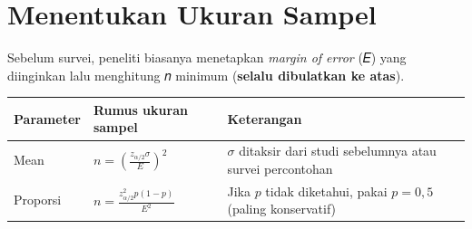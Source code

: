 \documentclass[
  indonesian,
  letterpaper,
]{book}
\newcounter{none} %
\begin{document}

\chapter{Menentukan Ukuran Sampel}\label{menentukan-ukuran-sampel}

Sebelum survei, peneliti biasanya menetapkan \emph{margin of error} (𝐸)
yang diinginkan lalu menghitung 𝑛 minimum (\textbf{selalu dibulatkan ke
atas}).

{\def\LTcaptype{none} %
\begin{longtable}[]{@{}
  >{\raggedright\arraybackslash}p{}
  >{\centering\arraybackslash}p{}
  >{\raggedright\arraybackslash}p{}@{}}
\toprule\noalign{}
\begin{minipage}[b]{\linewidth}\raggedright
Parameter
\end{minipage} & \begin{minipage}[b]{\linewidth}\centering
Rumus ukuran sampel
\end{minipage} & \begin{minipage}[b]{\linewidth}\raggedright
Keterangan
\end{minipage} \\
\midrule\noalign{}
\endhead
\bottomrule\noalign{}
\endlastfoot
Mean & \(n = \left(\frac{z_{\alpha/2}\sigma}{E}\right)^2\) & \(\sigma\)
ditaksir dari studi sebelumnya atau survei percontohan \\
Proporsi & \(n = \frac{z_{\alpha/2}^2 p(1-p)}{E^2}\) & Jika \(p\) tidak
diketahui, pakai \(p = 0{,}5\) (paling konservatif) \\
\end{longtable}
}
\end{document}
